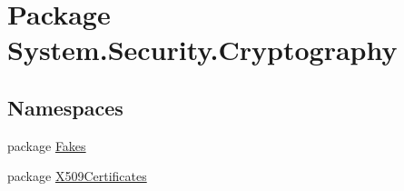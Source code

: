 \hypertarget{namespace_system_1_1_security_1_1_cryptography}{\section{Package System.\-Security.\-Cryptography}
\label{namespace_system_1_1_security_1_1_cryptography}
}
\subsection*{Namespaces}
\begin{DoxyCompactItemize}
\item 
package \hyperlink{namespace_system_1_1_security_1_1_cryptography_1_1_fakes}{Fakes}
\item 
package \hyperlink{namespace_system_1_1_security_1_1_cryptography_1_1_x509_certificates}{X509\-Certificates}
\end{DoxyCompactItemize}
